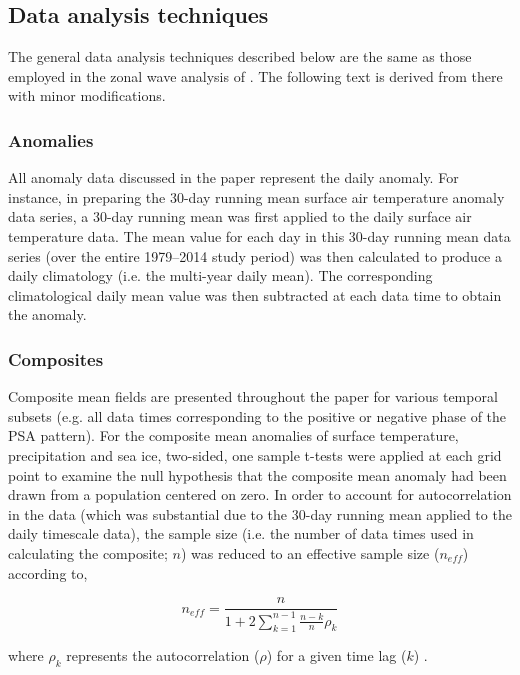 \subsection{Data analysis techniques}

The general data analysis techniques described below are the same as those employed in the zonal wave analysis of \citet{IrvingSimmonds2015}. The following text is derived from there with minor modifications.

\subsubsection{Anomalies}
All anomaly data discussed in the paper represent the daily anomaly. For instance, in preparing the 30-day running mean surface air temperature anomaly data series, a 30-day running mean was first applied to the daily surface air temperature data. The mean value for each day in this 30-day running mean data series (over the entire 1979--2014 study period) was then calculated to produce a daily climatology (i.e. the multi-year daily mean). The corresponding climatological daily mean value was then subtracted at each data time to obtain the anomaly.  

\subsubsection{Composites}
Composite mean fields are presented throughout the paper for various temporal subsets (e.g. all data times corresponding to the positive or negative phase of the PSA pattern). For the composite mean anomalies of surface temperature, precipitation and sea ice, two-sided, one sample t-tests were applied at each grid point to examine the null hypothesis that the composite mean anomaly had been drawn from a population centered on zero. In order to account for autocorrelation in the data (which was substantial due to the 30-day running mean applied to the daily timescale data), the sample size (i.e. the number of data times used in calculating the composite; $n$) was reduced to an effective sample size ($n_{eff}$) according to,

\begin{equation}\label{eq:effective_sample_size}
n_{eff} = \frac{n}{1 + 2\displaystyle\sum_{k=1}^{n-1} \frac{n-k}{n}\rho_k}
\end{equation}

\noindent where $\rho_k$ represents the autocorrelation ($\rho$) for a given time lag ($k$) \citep{Zieba2010}.  


